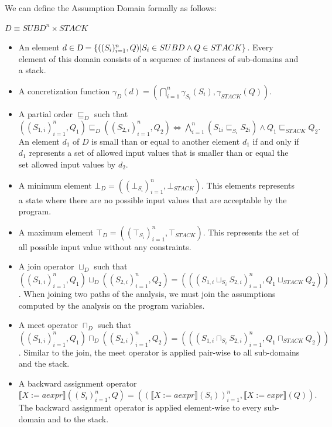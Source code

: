 \documentclass[10pt]{report}
\begin{document}
We can define the Assumption Domain formally as follows: \\
\begin{center}
	$D \equiv SUBD^{n} \times STACK$\\	
\end{center}
\begin{itemize}
	\item An element $d \in \textsl{D} = \lbrace ((S_{i})_{i=1}^{n}, Q) \vert S_{i} \in SUBD \wedge Q \in STACK \rbrace$. Every element of this domain consists of a sequence of instances of sub-domains and a stack.
	\item A concretization function $\gamma_{D}(d) =( \bigcap\limits_{i=1}^{n}\gamma_{S_{i}}(S_{i}), \gamma_{STACK}(Q)).$ 
	 
	\item A partial order $\sqsubseteq_{D}$ such that $ ((S_{1,i})_{i=1}^{n}, Q_{1}) \sqsubseteq_{D} ((S_{2, i})_{i=1}^{n}, Q_{2}) \Longleftrightarrow \bigwedge\limits_{i=1}^{n}(S_{1i} \sqsubseteq_{S_{i}} S_{2i}) \wedge Q_{1} \sqsubseteq_{STACK} Q_{2} .$ An element $ d_{1} $ of $ D $ is small than or equal to another element $ d_{1} $ if and only if $ d_{1} $ represents a set of allowed input values that is smaller than or equal the set allowed input values by $ d_{2} $. 
	\item A minimum element $\bot_{D} = ((\bot_{S_{i}})_{i=1}^{n}, \bot_{STACK})$. This elements represents a state where there are no possible input values that are acceptable by the program. 
	\item A maximum element $\top_{D} =  ((\top_{S_{i}})_{i=1}^{n}, \top_{STACK})$. This represents the set of all possible input value without any constraints. 
	\item A join operator $\sqcup_{D}$ such that $ ((S_{1,i})_{i=1}^{n}, Q_{1}) \sqcup_{D} ((S_{2,i})_{i=1}^{n}, Q_{2}) = (((S_{1,i} \sqcup_{S_{i}} S_{2,i})_{i=1}^{n}, Q_{1} \sqcup_{STACK} Q_{2}))$. When joining two paths of the analysis, we must join the assumptions computed by the analysis on the program variables. 
	\item A meet operator $\sqcap_{D}$ such that $ ((S_{1,i})_{i=1}^{n}, Q_{1}) \sqcap_{D} ((S_{2,i})_{i=1}^{n}, Q_{2}) = (((S_{1,i} \sqcap_{S_{i}} S_{2,i})_{i=1}^{n}, Q_{1} \sqcap_{STACK} Q_{2}))$. Similar to the join, the meet operator is applied pair-wise to all sub-domains and the stack.
	\item A backward assignment operator $\llbracket X:=aexpr \rrbracket ((S_{i})_{i=1}^{n}, Q) =  ((\llbracket X:=aexpr \rrbracket(S_{i}))_{i=1}^{n}, \llbracket X:= expr \rrbracket(Q)).$ The backward assignment operator is applied element-wise to every sub-domain and to the stack. 

\end{itemize}
\end{document}
